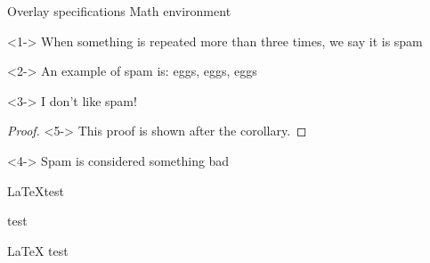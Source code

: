 \documentclass{beamer}
\begin{document}
\begin{frame}{Overlay specifications Math environment}
    \begin{definition}<1->
    When something is repeated more than three times, we say it is spam
\end{definition}

\begin{example}<2->
    An example of spam is: eggs, eggs, eggs
\end{example}

\begin{theorem}<3->
    I don’t like spam!
\end{theorem}

\begin{proof}<5->
    This proof is shown after the corollary.
\end{proof}

\begin{corollary}<4->
    Spam is considered something bad
\end{corollary}

\LaTeX test

\Latex{} test

{\LaTeX} test
\end{frame}
\end{document}
